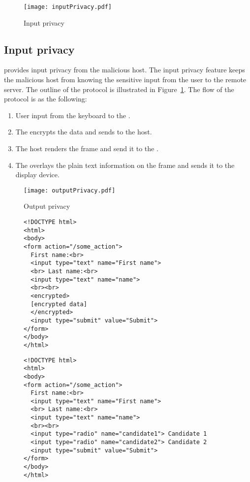 \begin{figure}[h]
\centering
\texttt{[image: inputPrivacy.pdf]}
\caption{Input privacy}
\label{fig:inputPrivacy}
\centering
\end{figure}

\subsection{Input privacy}
\label{sec:systemnDesign:inputPrivacy}

\name provides input privacy from the malicious host. The input privacy feature keeps the malicious host from knowing the sensitive input from the user to the remote server. The outline of the protocol is illustrated in Figure~\ref{fig:inputPrivacy}. The flow of the protocol is as the following:

\begin{enumerate}
  \item[\one] User input from the keyboard to the \device.
  \item[\two] The \device encrypts the data and sends to the host.
  \item[\three] The host renders the frame and send it to the \device.
  \item[\four] The \device overlays the plain text information on the frame and sends it to the display device.
\end{enumerate}


\begin{figure}[h]
\centering
\texttt{[image: outputPrivacy.pdf]}
\caption{Output privacy}
\label{fig:outputPrivacy}
\centering
\end{figure}

\begin{figure}[t]
\small
\begin{lstlisting}[mathescape=true]
<!DOCTYPE html>
<html>
<body>
<form action="/some_action">
  First name:<br>
  <input type="text" name="First name">
  <br> Last name:<br>
  <input type="text" name="name">
  <br><br>
  <encrypted>
  [encrypted data]
  </encrypted>
  <input type="submit" value="Submit">
</form> 
</body>
</html>
\end{lstlisting} 
\end{figure}


\begin{figure}[t]
\small
\begin{lstlisting}[mathescape=true]
<!DOCTYPE html>
<html>
<body>
<form action="/some_action">
  First name:<br>
  <input type="text" name="First name">
  <br> Last name:<br>
  <input type="text" name="name">
  <br><br>
  <input type="radio" name="candidate1"> Candidate 1
  <input type="radio" name="candidate2"> Candidate 2
  <input type="submit" value="Submit">
</form> 
</body>
</html>
\end{lstlisting} 
\end{figure}


